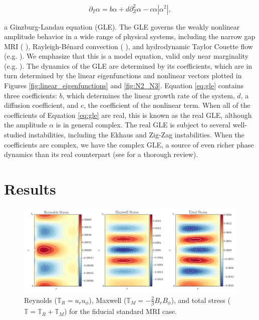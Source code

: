 \documentclass{emulateapj}
\newcommand{\beq}{\begin{equation}}
\newcommand{\eeq}{\end{equation}}
\newcommand{\citei}[1]{\citeauthor{#1} \citeyear{#1}}
\begin{document}
\beq
 \label{eq:gle}
\partial_T \alpha = b \alpha + d \partial_Z^2 \alpha - c \alpha \left|\alpha^2\right|,
\eeq

a Ginzburg-Landau equation (GLE). The GLE governs the weakly nonlinear amplitude behavior in a wide range of physical systems, including the narrow gap MRI (\citei{Umurhan:2007hs}), Rayleigh-B\'enard convection (\citei{Newell:1969wr}), and hydrodynamic Taylor Couette flow (e.g. \citei{Recktenwald:1993}). We emphasize that this is a model equation, valid only near marginality (e.g. \citei{Cross:1993el}). The dynamics of the GLE are determined by its coefficients, which are in turn determined by the linear eigenfunctions and nonlinear vectors plotted in Figures \ref{fig:linear_eigenfunctions} and \ref{fig:N2_N3}. Equation \ref{eq:gle} contains three coefficients: $b$, which determines the linear growth rate of the system, $d$, a diffusion coefficient, and $c$, the coefficient of the nonlinear term. When all of the coefficients of Equation \ref{eq:gle} are real, this is known as the real GLE, although the amplitude $\alpha$ is in general complex. The real GLE is subject to several well-studied instabilities, including the Ekhaus and Zig-Zag instabilities. When the coefficients are complex, we have the complex GLE, a source of even richer phase dynamics than its real counterpart (see \citei{Aranson:2002} for a thorough review).


\section{Results}

\begin{figure}
\centering
\includegraphics[width=\textwidth]{../figures/widegap_rey_max_tot_stresses.png}
\caption{Reynolds ($\mathbb{T}_{R} = u_r u_\phi$), Maxwell ($\mathbb{T}_{M} = -\frac{2}{\beta} B_r B_\phi$), and total stress ($\mathbb{T} = \mathbb{T}_{R} + \mathbb{T}_{M}$) for the fiducial standard MRI case. }
\end{figure}
\end{document}
